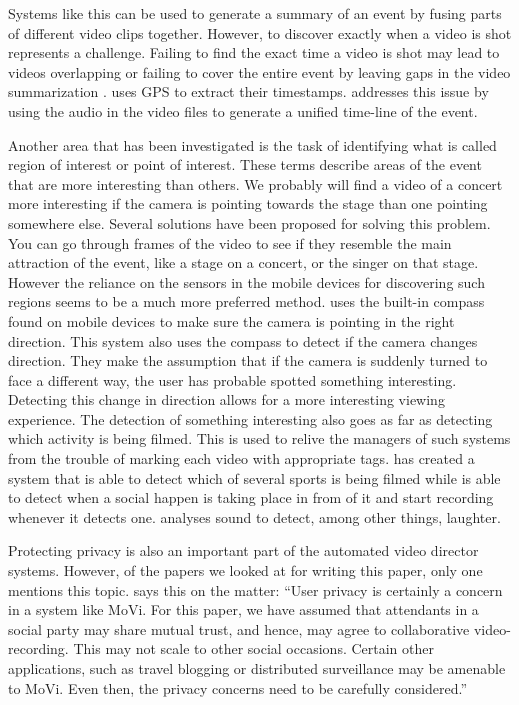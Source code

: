 \documentclass[conference]{IEEEtran}
\begin{document}
Systems like this can be used to generate a summary of an event by fusing parts of different video clips together. However, to discover exactly when a video is shot represents a challenge. Failing to find the exact time a video is shot may lead to videos overlapping or failing to cover the entire event by leaving gaps in the video summarization \cite{shrestha_automatic_2010}. \cite{jain_focus:_2013} uses GPS to extract their timestamps. \cite{shrestha_automatic_2010} addresses this issue by using the audio in the video files to generate a unified time-line of the event. 

Another area that has been investigated is the task of identifying what is called region of interest or point of interest. These terms describe areas of the event that are more interesting than others. We probably will find a video of a concert more interesting if the camera is pointing towards the stage than one pointing somewhere else. Several solutions have been proposed for solving this problem. You can go through frames of the video to see if they resemble the main attraction of the event, like a stage on a concert, or the singer on that stage. However the reliance on the sensors in the mobile devices for discovering such regions seems to be a much more preferred method. \cite{cricri_sensor-based_2012} uses the built-in compass found on mobile devices to make sure the camera is pointing in the right direction. This system also uses the compass to detect if the camera changes direction. They make the assumption that if the camera is suddenly turned to face a different way, the user has probable spotted something interesting. Detecting this change in direction allows for a more interesting viewing experience. 
The detection of something interesting also goes as far as detecting which activity is being filmed.  This is used to relive the managers of such systems from the trouble of marking each video with appropriate tags. \cite{cricri_sport_2014}has created a system that is able to detect which of several sports is being filmed while \cite{bao_movi:_2010} is able to detect when a social happen is taking place in from of it and start recording whenever it detects one. \cite{bao_movi:_2010} analyses sound to detect, among other things, laughter. 

Protecting privacy is also an important part of the automated video director systems. However, of the papers we looked at for writing this paper, only one mentions this topic. \cite{bao_movi:_2010} says this on the matter:
“User privacy is certainly a concern in a system like MoVi. For this paper, we have assumed that attendants in a social party may share mutual trust, and hence, may agree to collaborative video-recording. This may not scale to other social occasions. Certain other applications, such as travel blogging or distributed surveillance may be amenable to MoVi. Even then, the privacy concerns need to be carefully considered.”
\end{document}
